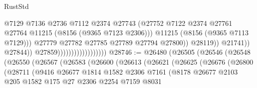 \begin{lexlean}{RustStd}
\begin{coremodule}
{\begin{coremodule}
{{{{{{{{{{{{{{{{{{{{{{{{{{{{{{{{{{                                                          @7129
                                                          @7136
                                                          @2736
                                                          @7112
                                                          @2374
                                                          @27743
                                                          (@27752
                                                            @7122
                                                            @2374
                                                            @27761
                                                            @27764
                                                            @11215
                                                            (@8156 (@9365 @7123 @2306)))
                                                          @11215
                                                          (@8156 (@9365 @7113 @7129)))
                                                        @27779
                                                        @27782
                                                        @27785
                                                        @27789
                                                        @27794
                                                        @27800))
                                                    @28119))
                                                @21741))
                                            @27844))
                                        @27859))))))))))))))))))
@28746 := @26480
    (@26505
      (@26546
        (@26548
          (@26550
            (@26567
              (@26583
                (@26600
                  (@26613
                    (@26621
                      (@26625
                        (@26676
                          (@26800
                            (@28711
                              (@9416
                                @26677
                                @1814
                                @1582
                                @2306
                                @7161
                                (@8178
                                  @26677
                                  @2103
                                  @205
                                  @1582
                                  @175
                                  @27
                                  @2306
                                  @2254
                                  @7159
                                  @8031
}}}}}}}}}}}}}}}}}}}}}}}}}}}}}}}}}}
\end{coremodule}}
\end{coremodule}
\end{lexlean}
